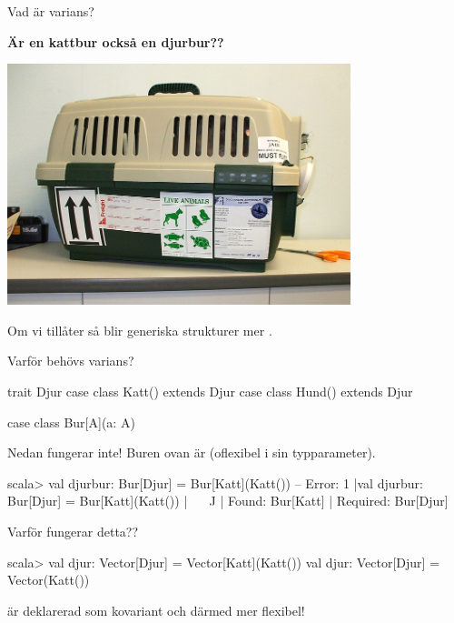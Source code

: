 \begin{Slide}{Vad är varians?}
\begin{center}
\textbf{Är en kattbur också en djurbur??}

\includegraphics[width=0.75\textwidth]{../img/pet-carrier.jpg}  

Om vi tillåter  så blir generiska strukturer mer .
\end{center}
\end{Slide}

\begin{Slide}{Varför behövs varians?}\SlideFontSmall
\begin{Code}
trait Djur
case class Katt() extends Djur
case class Hund() extends Djur

case class Bur[A](a: A)
\end{Code}
\pause
Nedan fungerar inte! Buren ovan är  (oflexibel i sin typparameter).
\begin{REPL}
scala> val djurbur: Bur[Djur] = Bur[Katt](Katt())
-- Error:
1 |val djurbur: Bur[Djur] = Bur[Katt](Katt())
  |                   ^^^^^^^^^^^^^^^^^
  |                   Found:    Bur[Katt]
  |                   Required: Bur[Djur]
\end{REPL}
\pause
Varför fungerar detta??
\begin{REPL}
scala> val djur: Vector[Djur] = Vector[Katt](Katt())
val djur: Vector[Djur] = Vector(Katt())
\end{REPL}
\pause {} är deklarerad som kovariant och därmed mer flexibel!
\end{Slide}



